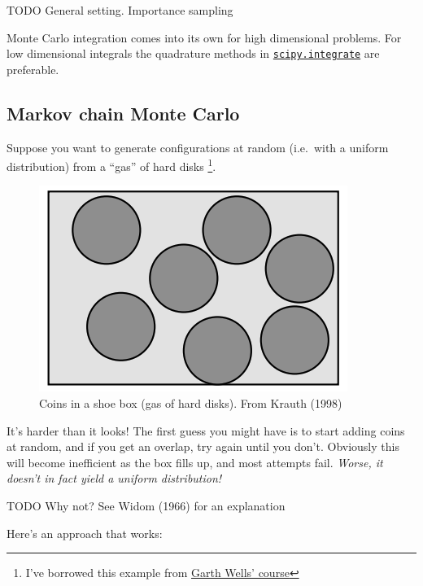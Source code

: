 \documentclass[
  letterpaper,
  DIV=11,
  numbers=noendperiod]{scrreprt}
\theoremstyle{definition}
\theoremstyle{remark}
\begin{document}
TODO General setting. Importance sampling

Monte Carlo integration comes into its own for high dimensional
problems. For low dimensional integrals the quadrature methods in
\href{https://docs.scipy.org/doc/scipy/tutorial/integrate.html}{\texttt{scipy.integrate}}
are preferable.

\hypertarget{sec-mcmc}{%
\subsection{Markov chain Monte Carlo}\label{sec-mcmc}}

Suppose you want to generate configurations at random (i.e.~with a
uniform distribution) from a ``gas'' of hard disks \footnote{I've
  borrowed this example from
  \href{https://github.com/CambridgeEngineering/PartIA-Computing-Michaelmas/blob/main/11\%20Complexity.ipynb}{Garth
  Wells' course}}.

\begin{figure}

{\centering \includegraphics{./assets/hard-spheres.png}

}

\caption{Coins in a shoe box (gas of hard disks). From Krauth (1998)}

\end{figure}

It's harder than it looks! The first guess you might have is to start
adding coins at random, and if you get an overlap, try again until you
don't. Obviously this will become inefficient as the box fills up, and
most attempts fail. \emph{Worse, it doesn't in fact yield a uniform
distribution!}

TODO Why not? See Widom (1966) for an explanation

Here's an approach that works:
\end{document}
